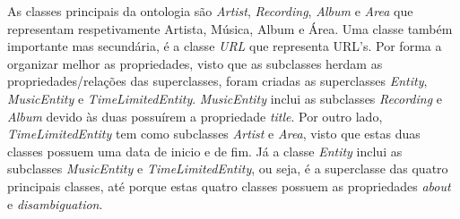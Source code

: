 \documentclass{article}
\begin{document}
As classes principais da ontologia são \textit{Artist}, \textit{Recording}, \textit{Album} e \textit{Area} que representam respetivamente Artista, Música, Album e Área. Uma classe também importante mas secundária, é a classe \textit{URL} que representa URL's. Por forma a organizar melhor as propriedades, visto que as subclasses herdam as propriedades/relações das superclasses, foram criadas as superclasses \textit{Entity}, \textit{MusicEntity} e \textit{TimeLimitedEntity}. \textit{MusicEntity} inclui as subclasses \textit{Recording} e \textit{Album} devido às duas possuírem a propriedade \textit{title}. Por outro lado, \textit{TimeLimitedEntity} tem como subclasses \textit{Artist} e \textit{Area}, visto que estas duas classes possuem uma data de inicio e de fim. Já a classe \textit{Entity} inclui as subclasses \textit{MusicEntity} e \textit{TimeLimitedEntity}, ou seja, é a superclasse das quatro principais classes, até porque estas quatro classes possuem as propriedades \textit{about} e \textit{disambiguation}.
\end{document}
